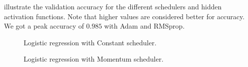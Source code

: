 \documentclass{article}
\theoremstyle{definition}
\begin{document}
 illustrate the validation accuracy for the different schedulers and hidden activation functions. Note that higher values are considered better for accuracy. We got a peak accuracy of $0.985$ with Adam and RMSprop.

\begin{figure}[H]%
    \centering
    \qquad
    \caption{Logistic regression with Constant scheduler.}%
    \label{fig:1CancerConstant}%
\end{figure}
\begin{figure}[H]%
    \centering
    \qquad
    \caption{Logistic regression with Momentum scheduler.}%
    \label{fig:1CancerMomentum}%
\end{figure}
\end{document}
